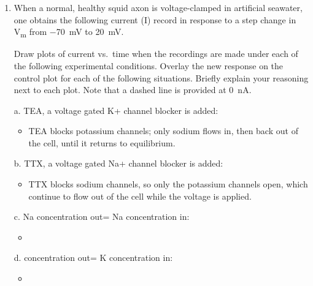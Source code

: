 \documentclass[plain,worksheet]{inVerba-notes}
\begin{document}
\begin{enumerate}[resume]
    \item When a normal, healthy squid axon is voltage-clamped in artificial seawater, one obtains the following current (I) record in response to a step change in \si{V_m} from \SI{-70}{mV} to \SI{+20}{mV}.
    
    \bigskip
    \begin{center}
        
    \end{center}

    Draw plots of current vs.\ time when the recordings are made under each of the following experimental conditions.  Overlay the new response on the control plot for each of the following situations. Briefly explain your reasoning next to each plot. Note that a dashed line is provided at \SI{0}{nA}. 
    
    \item[a.] TEA, a voltage gated K+ channel blocker is added:
    
    \bigskip
    \begin{center}
        
    \end{center}
    \begin{itemize}
        \item TEA blocks potassium channels; only sodium flows in, then back out of the cell, until it returns to equilibrium.
    \end{itemize}
    \newpage
    \item[b.] TTX, a voltage gated Na+ channel blocker is added:
    
    \bigskip
    \bigskip
    \begin{center}
        
    \end{center}
    
    \begin{itemize}
        \item TTX blocks sodium channels, so only the potassium channels open, which continue to flow out of the cell while the voltage is applied.
    \end{itemize}

    \item[c.] Na concentration out= Na concentration in:
    
    \bigskip
    \bigskip
    \begin{center}
        
    \end{center}
    
    \begin{itemize}
        \item 
    \end{itemize}

    \item[d.]  concentration out= K concentration in:

    \bigskip
    \bigskip
    \begin{center}
        
    \end{center}
    
    \begin{itemize}
        \item 
    \end{itemize}
\end{enumerate}
\end{document}
